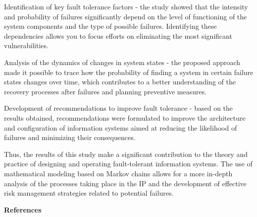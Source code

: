 \begin{multicols}{2}
Identification of key fault tolerance factors - the study showed that
the intensity and probability of failures significantly depend on the
level of functioning of the system components and the type of possible
failures. Identifying these dependencies allows you to focus efforts on
eliminating the most significant vulnerabilities.

Analysis of the dynamics of changes in system states - the proposed
approach made it possible to trace how the probability of finding a
system in certain failure states changes over time, which contributes to
a better understanding of the recovery processes after failures and
planning preventive measures.

Development of recommendations to improve fault tolerance - based on the
results obtained, recommendations were formulated to improve the
architecture and configuration of information systems aimed at reducing
the likelihood of failures and minimizing their consequences.

Thus, the results of this study make a significant contribution to the
theory and practice of designing and operating fault-tolerant
information systems. The use of mathematical modeling based on Markov
chains allows for a more in-depth analysis of the processes taking place
in the IP and the development of effective risk management strategies
related to potential failures.
\end{multicols}

\begin{center}
{\bfseries References}
\end{center}

